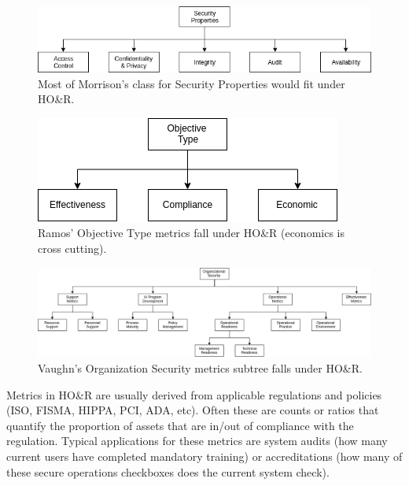 \begin{figure}[ht]
\centering
\includegraphics[width=.9\linewidth]{resource/img/ch_background/cybok_metrics/morrison_sec_props.png}
\caption{Most of Morrison’s class for Security Properties would fit under HO\&R.
\label{fig:background:cybok_hor_metrics_morrison}}
\end{figure} 

\begin{figure}[ht]
\centering
\includegraphics[width=.6\linewidth]{resource/img/ch_background/cybok_metrics/ramos_objective_type.png}
\caption{Ramos’ Objective Type metrics fall under HO\&R (economics is cross cutting).
\label{fig:background:cybok_hor_metrics_ramos}}
\end{figure} 


\begin{figure}[ht]
\centering
\includegraphics[width=.95\linewidth]{resource/img/ch_background/cybok_metrics/vaughn_org_metrics.png}
\caption{Vaughn’s Organization Security metrics subtree  falls under HO\&R.
\label{fig:background:cybok_hor_metrics_vaughn}}
\end{figure} 

Metrics in HO\&R are usually derived from applicable regulations and policies (ISO, FISMA, HIPPA, PCI, ADA, etc). Often these are counts or ratios that quantify the proportion of assets that are in/out of compliance with the regulation. Typical applications for these metrics are system audits (how many current users have completed mandatory training) or accreditations (how many of these secure operations checkboxes does the current system check).


